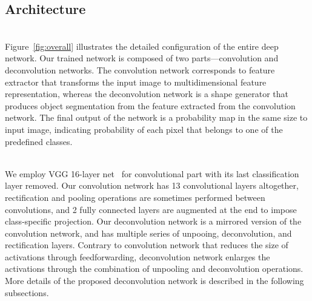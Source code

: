 \documentclass[10pt,twocolumn,letterpaper]{article}
\begin{document}
\subsection{Architecture}

\ifdefined{} \\ \fi
Figure~\ref{fig:overall} illustrates the detailed configuration of the entire deep network.
Our trained network is composed of two parts---convolution and deconvolution networks. 
The convolution network corresponds to feature extractor that transforms the input image to multidimensional feature representation, whereas the deconvolution network is a shape generator that produces object segmentation from the feature extracted from the convolution network.
The final output of the network is a probability map in the same size to input image, indicating probability of each pixel that belongs to one of the predefined classes.

\ifdefined{} \\ \fi
We employ VGG 16-layer net~\cite{Vgg16} for convolutional part with its last classification layer removed. 
Our convolution network has 13 convolutional layers altogether, rectification and pooling operations are sometimes performed between convolutions, and 2 fully connected layers are augmented at the end to impose class-specific projection.
Our deconvolution network is a mirrored version of the convolution network, and has multiple series of unpooing, deconvolution, and rectification layers.
Contrary to convolution network that reduces the size of activations through feedforwarding, deconvolution network enlarges the activations through the combination of unpooling and deconvolution operations.
More details of the proposed deconvolution network is described in the following subsections.


\iffalse
That is, convolution part of the network generate feature representation for the image and deconvolution generate shape mask from this feature representation. 
Our network can be separated to two parts, convolution part and deconvolution part. 
Convolution part is same as vgg-16~\cite{Vgg16} network with its final classification layer detached. Deconvolution part is mirrored version of vgg16, with its convolution layer is converted to deconvolution layer, pooling layer is converted to unpooling layer except for the first convolution layer. 
Instead of the using deconvolution layer corresponding to first convolution layer, we use 1x1 convolution with 21 channel output to generate class dependent labeling.
\fi
\end{document}
